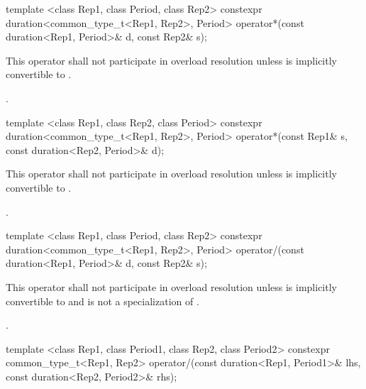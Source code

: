 %
\begin{itemdecl}
template <class Rep1, class Period, class Rep2>
  constexpr duration<common_type_t<Rep1, Rep2>, Period>
  operator*(const duration<Rep1, Period>& d, const Rep2& s);
\end{itemdecl}

\begin{itemdescr}
\pnum
\remarks This operator shall not participate in overload
resolution unless  is implicitly convertible to .

\pnum
\returns {}.
\end{itemdescr}

%
\begin{itemdecl}
template <class Rep1, class Rep2, class Period>
  constexpr duration<common_type_t<Rep1, Rep2>, Period>
  operator*(const Rep1& s, const duration<Rep2, Period>& d);
\end{itemdecl}

\begin{itemdescr}
\pnum
\remarks This operator shall not participate in overload
resolution unless  is implicitly convertible to .

\pnum
\returns {}.
\end{itemdescr}

%
\begin{itemdecl}
template <class Rep1, class Period, class Rep2>
  constexpr duration<common_type_t<Rep1, Rep2>, Period>
  operator/(const duration<Rep1, Period>& d, const Rep2& s);
\end{itemdecl}

\begin{itemdescr}
\pnum
\remarks This operator shall not participate in overload
resolution unless  is implicitly convertible to 
and  is not a specialization of .

\pnum
\returns {}.
\end{itemdescr}

%
\begin{itemdecl}
template <class Rep1, class Period1, class Rep2, class Period2>
  constexpr common_type_t<Rep1, Rep2>
  operator/(const duration<Rep1, Period1>& lhs, const duration<Rep2, Period2>& rhs);
\end{itemdecl}

